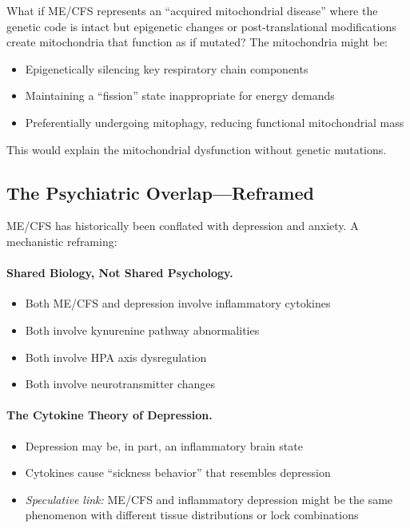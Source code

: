 \begin{open_question}
What if ME/CFS represents an ``acquired mitochondrial disease'' where the genetic code is intact but epigenetic changes or post-translational modifications create mitochondria that function as if mutated? The mitochondria might be:
\begin{itemize}
    \item Epigenetically silencing key respiratory chain components
    \item Maintaining a ``fission'' state inappropriate for energy demands
    \item Preferentially undergoing mitophagy, reducing functional mitochondrial mass
\end{itemize}
This would explain the mitochondrial dysfunction without genetic mutations.
\end{open_question}

\subsection{The Psychiatric Overlap---Reframed}

ME/CFS has historically been conflated with depression and anxiety. A mechanistic reframing:

\paragraph{Shared Biology, Not Shared Psychology.}
\begin{itemize}
    \item Both ME/CFS and depression involve inflammatory cytokines
    \item Both involve kynurenine pathway abnormalities
    \item Both involve HPA axis dysregulation
    \item Both involve neurotransmitter changes
\end{itemize}

\paragraph{The Cytokine Theory of Depression.}
\begin{itemize}
    \item Depression may be, in part, an inflammatory brain state
    \item Cytokines cause ``sickness behavior'' that resembles depression
    \item \textit{Speculative link:} ME/CFS and inflammatory depression might be the same phenomenon with different tissue distributions or lock combinations
\end{itemize}

